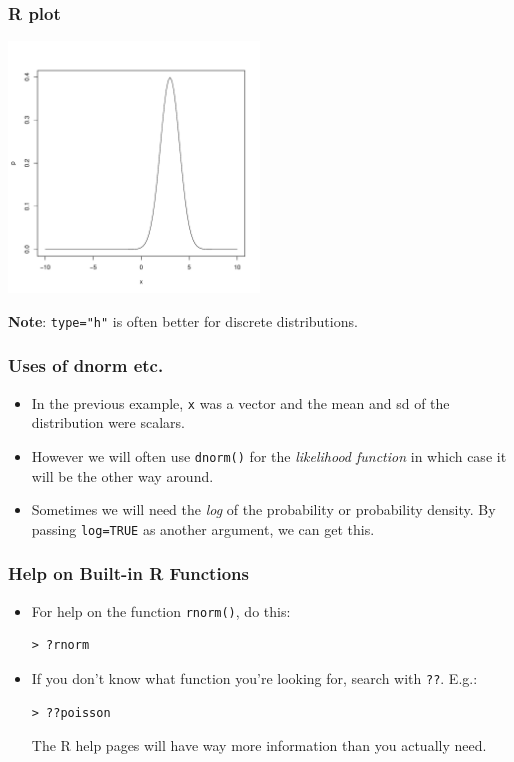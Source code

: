 \documentclass{beamer}
\begin{document}
\begin{frame}[fragile]
\frametitle{R plot}

\begin{center}
\includegraphics[width=0.5\textwidth]{images/R_normal.pdf}
\end{center}
\vspace{-1.5em}
{\bf Note}: \texttt{type="h"} is often better for
discrete distributions.
\end{frame}

\begin{frame}[fragile]
\frametitle{Uses of dnorm etc.}
\begin{itemize}
\item In the previous example, \texttt{x} was a vector
and the mean and sd of the distribution were scalars.\pause
\item However we will often use \texttt{dnorm()}
for the {\em likelihood function} in which case it will be the
other way around.\pause
\item Sometimes we will need the {\em log} of the probability
or probability density. By passing \texttt{log=TRUE}
as another argument, we can get this.
\end{itemize}

\end{frame}

\begin{frame}[fragile]
\frametitle{Help on Built-in R Functions}
\begin{itemize}
\item For help on the function \texttt{rnorm()}, do this:
\begin{verbatim}
> ?rnorm
\end{verbatim}
\item If you don't know what function you're looking for, search
with \texttt{??}. E.g.:
\begin{verbatim}
> ??poisson
\end{verbatim}
The R help pages will have way more information than you actually need.
\end{itemize}

\end{frame}
\end{document}
